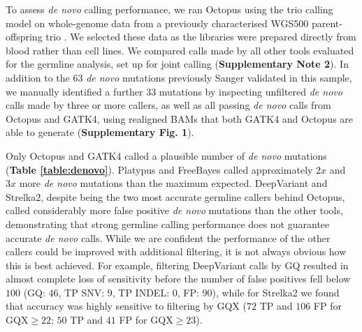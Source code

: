 \documentclass[notitlepage, twocolumn, 10pt]{article}
\begin{document}
\begin{table}[bp]
    \centering
    \caption{\textit{De novo} mutations called in WGS500 trio.}
    \label{table:denovo}
    \small
    \sffamily
\end{table}
To assess \textit{de novo} calling performance, we ran Octopus using the trio calling model on whole-genome data from a previously characterised WGS500 parent-offspring trio \cite{RN5}. We selected these data as the libraries were prepared directly from blood rather than cell lines. We compared calls made by all other tools evaluated for the germline analysis, set up for joint calling (\textbf{Supplementary Note 2}). In addition to the $63$ \textit{de novo} mutations previously Sanger validated in this sample, we manually identified a further $33$ mutations by inspecting unfiltered \textit{de novo} calls made by three or more callers, as well as all passing \textit{de novo} calls from Octopus and GATK4, using realigned BAMs that both GATK4 and Octopus are able to generate (\textbf{Supplementary Fig. 1}).

Only Octopus and GATK4 called a plausible number of \textit{de novo} mutations (\textbf{Table \ref{table:denovo}}). Platypus and FreeBayes called approximately $2x$ and $3x$ more \textit{de novo} mutations than the maximum expected. DeepVariant and Strelka2, despite being the two most accurate germline callers behind Octopus, called considerably more false positive \emph{de novo} mutations than the other tools, demonstrating that strong germline calling performance does not guarantee accurate \textit{de novo} calls. While we are confident the performance of the other callers could be improved with additional filtering, it is not always obvious how this is best achieved. For example, filtering DeepVariant calls by GQ resulted in almost complete loss of sensitivity before the number of false positives fell below $100$ (GQ: $46$, TP SNV: $9$, TP INDEL: $0$, FP: $90$), while for Strelka2 we found that accuracy was highly sensitive to filtering by GQX ($72$ TP and $106$ FP for $\text{GQX} \ge 22$; 
$50$ TP and $41$ FP for $\text{GQX} \ge 23$).
\end{document}
